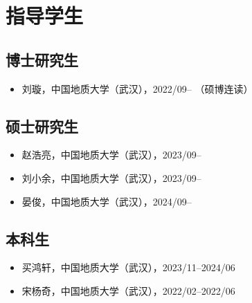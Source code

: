 \section{指导学生}

\subsection{博士研究生}
\begin{itemize}
\item 刘璇，中国地质大学（武汉），2022/09-- （硕博连读）
\end{itemize}

\subsection{硕士研究生}
\begin{itemize}
\item 赵浩亮，中国地质大学（武汉），2023/09--
\item 刘小余，中国地质大学（武汉），2023/09--
\item 晏俊，中国地质大学（武汉），2024/09--
\end{itemize}

\subsection{本科生}
\begin{itemize}
\item 买鸿轩，中国地质大学（武汉），2023/11--2024/06
\item 宋杨奇，中国地质大学（武汉），2022/02--2022/06
\end{itemize}
